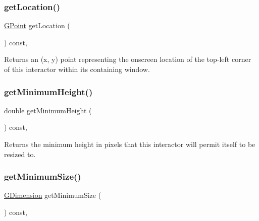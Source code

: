 \subsubsection{\texorpdfstring{get\+Location()}{getLocation()}}
{\footnotesize\ttfamily \mbox{\hyperlink{structsgl_1_1GPoint}{G\+Point}} get\+Location (\begin{DoxyParamCaption}{ }\end{DoxyParamCaption}) const\hspace{0.3cm}{\ttfamily [virtual]}, {\ttfamily [inherited]}}



Returns an (x, y) point representing the onscreen location of the top-\/left corner of this interactor within its containing window. 

\mbox{\label{classsgl_1_1GInteractor_aed4b0075fcc434499c3cb3e46896bda3}} 
\subsubsection{\texorpdfstring{get\+Minimum\+Height()}{getMinimumHeight()}}
{\footnotesize\ttfamily double get\+Minimum\+Height (\begin{DoxyParamCaption}{ }\end{DoxyParamCaption}) const\hspace{0.3cm}{\ttfamily [virtual]}, {\ttfamily [inherited]}}



Returns the minimum height in pixels that this interactor will permit itself to be resized to. 

\mbox{\label{classsgl_1_1GInteractor_a66b5af0b32493b4d597ca0a3df2049ea}} 
\subsubsection{\texorpdfstring{get\+Minimum\+Size()}{getMinimumSize()}}
{\footnotesize\ttfamily \mbox{\hyperlink{structsgl_1_1GDimension}{G\+Dimension}} get\+Minimum\+Size (\begin{DoxyParamCaption}{ }\end{DoxyParamCaption}) const\hspace{0.3cm}{\ttfamily [virtual]}, {\ttfamily [inherited]}}



